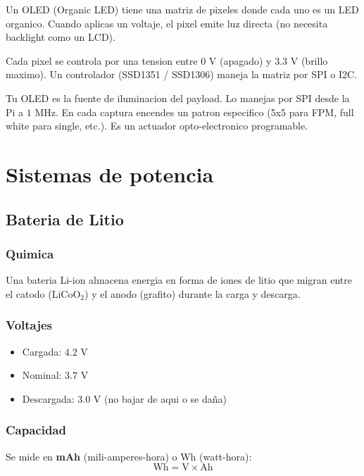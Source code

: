 \documentclass[11pt,a4paper,oneside,openright]{book}
\begin{document}
Un OLED (Organic LED) tiene una matriz de pixeles donde cada uno es un
LED organico. Cuando aplicas un voltaje, el pixel emite luz directa
(no necesita backlight como un LCD).

Cada pixel se controla por una tension entre $0$ V (apagado) y $3.3$ V
(brillo maximo). Un controlador (SSD1351 / SSD1306) maneja la matriz por
SPI o I2C.

\begin{payload}
Tu OLED es la fuente de iluminacion del payload. Lo manejas por SPI desde
la Pi a $1$ MHz. En cada captura encendes un patron especifico (5x5
para FPM, full white para single, etc.). Es un actuador opto-electronico
programable.
\end{payload}

\part{Sistemas de potencia}

\chapter{Bateria de Litio}

\section{Quimica}

Una bateria Li-ion almacena energia en forma de iones de litio que
migran entre el catodo (LiCoO$_2$) y el anodo (grafito) durante la carga
y descarga.

\section{Voltajes}

\begin{itemize}[leftmargin=2em]
  \item Cargada: $4.2$ V
  \item Nominal: $3.7$ V
  \item Descargada: $3.0$ V (no bajar de aqui o se daña)
\end{itemize}

\section{Capacidad}

Se mide en \textbf{mAh} (mili-amperes-hora) o Wh (watt-hora):
\[
\text{Wh} = \text{V} \times \text{Ah}
\]
\end{document}
